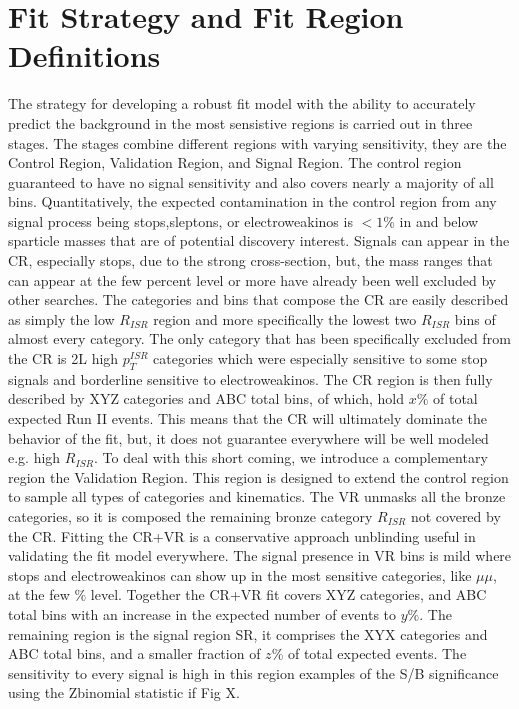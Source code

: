 \section{Fit Strategy and Fit Region Definitions}
The strategy for developing a robust fit model with the ability to accurately predict the background in the most sensistive regions is carried out in three stages. The stages combine different regions with varying sensitivity, they are the Control Region, Validation Region, and Signal Region. The control region guaranteed to have no signal sensitivity and also covers nearly a majority of all bins. Quantitatively, the expected contamination in the control region from any signal process being stops,sleptons, or electroweakinos is $<1\%$ in and below sparticle masses that are of potential discovery interest. Signals can appear in the CR, especially stops, due to the strong cross-section, but, the mass ranges that can appear at the few percent level or more have already been well excluded by other searches. The categories and bins that compose the CR are easily described as simply the low $R_{ISR}$ region and more specifically the lowest two $R_{ISR}$ bins of almost every category. The only category that has been specifically excluded from the CR is 2L high $p_T^{ISR}$ categories which were especially sensitive to some stop signals and borderline sensitive to electroweakinos. The CR region is then fully described by XYZ categories and ABC total bins, of which, hold $x\%$ of total expected Run II events. This means that the CR will ultimately dominate the behavior of the fit, but, it does not guarantee everywhere will be well modeled e.g. high $R_{ISR}$. To deal with this short coming, we introduce a complementary region the Validation Region. This region is designed to extend the control region to sample all types of categories and kinematics. The VR unmasks all the bronze categories, so it is composed the remaining bronze category $R_{ISR}$ not covered by the CR. Fitting the CR+VR is a conservative approach unblinding useful in validating the fit model everywhere. The signal presence in VR bins is mild where stops and electroweakinos can show up in the most sensitive categories, like $\mu\mu$, at the few $\%$ level. Together the CR+VR fit covers XYZ categories, and ABC total bins with an increase in the expected number of events to $y\%$. The remaining region is the signal region SR, it comprises the XYX categories and ABC total bins, and a smaller fraction of $z\%$ of total expected events. The sensitivity to every signal is high in this region examples of the S/B significance using the Zbinomial statistic if Fig X.

